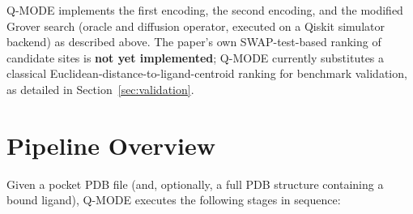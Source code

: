 \documentclass[11pt,a4paper]{article}
\begin{document}
Q-MODE implements the first encoding, the second encoding, and the modified Grover search (oracle and diffusion operator, executed on a Qiskit simulator backend) as described above. The paper's own SWAP-test-based ranking of candidate sites is \textbf{not yet implemented}; Q-MODE currently substitutes a classical Euclidean-distance-to-ligand-centroid ranking for benchmark validation, as detailed in Section~\ref{sec:validation}.

\section{Pipeline Overview}

Given a pocket PDB file (and, optionally, a full PDB structure containing a bound ligand), Q-MODE executes the following stages in sequence:
\end{document}
